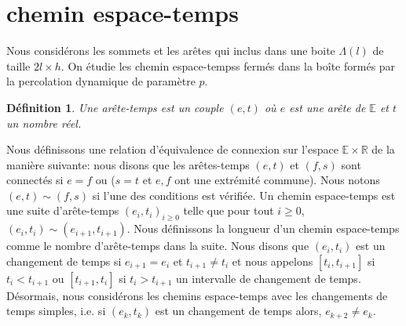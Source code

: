 \documentclass[titlepage,a4paper,12pt]{article}
\newcounter{d}
\newcounter{t}
\newcounter{p}
\newcounter{c}
\newcounter{a}
\newcounter{l}
\newtheorem{defi}[d]{Définition}
\begin{document}
\section{chemin espace-temps}
Nous considérons les sommets et les arêtes qui inclus dans une boite $\Lambda(l)$ de taille $2l\times h$. On étudie les chemin espace-tempss fermés dans la boîte formés par la percolation dynamique de paramètre $p$.
\begin{defi}
Une arête-temps est un couple $(e,t)$ où $e$ est une arête de $\mathbb{E}$ et $t$ un nombre réel. 
\end{defi}

Nous définissons une relation d'équivalence de connexion sur l'espace $\mathbb{E}\times \mathbb{R}$ de la manière suivante: nous disons que les arêtes-temps $(e,t)$ et $(f,s)$ sont connectés si $e=f$ ou ($s=t$ et $e,f$ ont une extrémité commune). Nous notons $(e,t)\sim(f,s)$ si l'une des conditions est vérifiée. Un chemin espace-temps est une suite d'arête-temps $(e_i,t_i)_{i\geqslant 0}$ telle que pour tout $i\geqslant 0$, $(e_i,t_i)\sim(e_{i+1},t_{i+1})$. Nous définissons la longueur d'un chemin espace-temps comme le nombre d'arête-temps dans la suite. Nous disons que $(e_i,t_i)$ est un changement de temps si $e_{i+1} = e_i$ et $t_{i+1}\neq t_i$ et nous appelons $[t_i,t_{i+1}]$ si $t_i<t_{i+1}$ ou $[t_{i+1},t_i]$ si $t_i> t_{i+1}$ un intervalle de changement de temps. Désormais, nous considérons les chemins espace-temps avec les changements de temps simples, i.e. si $(e_k,t_k)$ est un changement de temps alors, $e_{k+2} \neq e_k$. 
\end{document}
